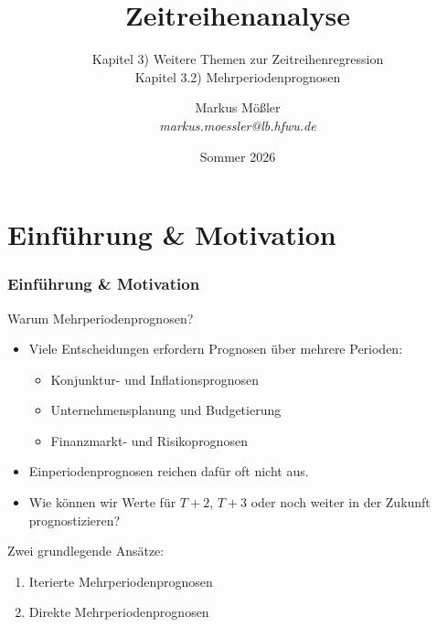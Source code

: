 \documentclass[10pt,aspectratio=169]{beamer}\usepackage[]{graphicx}\usepackage[]{xcolor}
\title[ZA-ZUB-HfWU]{Zeitreihenanalyse}
\subtitle{
    \large{Kapitel 3) Weitere Themen zur Zeitreihenregression} \\
    \small{Kapitel 3.2) Mehrperiodenprognosen}
}
\date{Sommer 2026}
\author{
Markus M\"o\ss{}ler \\
\textit{\fontsize{6pt}{7.2pt}\selectfont markus.moessler@lb.hfwu.de}
}
\institute[HfWU]
{
Hochschule for Wirtschaft und Umwelt (HfWU) \\
Zukunftsökonomie (B.Sc.)
}
\begin{document}
\maketitle



\section*{Einführung \& Motivation}



\begin{frame}
  \frametitle{Einführung \& Motivation}

  Warum Mehrperiodenprognosen?

  \begin{itemize}
    \item Viele Entscheidungen erfordern Prognosen über mehrere Perioden:
    \begin{itemize}
      \item Konjunktur- und Inflationsprognosen
      \item Unternehmensplanung und Budgetierung
      \item Finanzmarkt- und Risikoprognosen
    \end{itemize}

    \item Einperiodenprognosen reichen dafür oft nicht aus.

    \item Wie können wir Werte für $T+2$, $T+3$ oder noch weiter in der Zukunft prognostizieren?
  \end{itemize}


  Zwei grundlegende Ansätze:

  \begin{enumerate}
    \item Iterierte Mehrperiodenprognosen
    \item Direkte Mehrperiodenprognosen
  \end{enumerate}

\end{frame}
\end{document}
